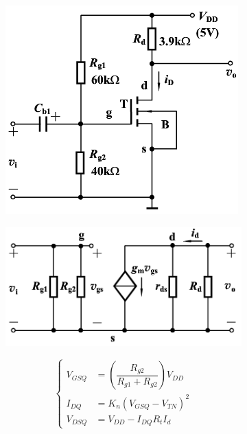 \begin{figure}[H]
  \centering
  \begin{subfigure}{.3\textwidth}
    \centering
    \includegraphics[width=\linewidth]{figures/MOSFET-Common-S}
  \end{subfigure}
  \begin{subfigure}{.6\textwidth}
    \centering
    \includegraphics[width=\linewidth]{figures/MOSFET-Common-Ss}
  \end{subfigure}
\end{figure}

\begin{equation*}
  \left\{
  \begin{aligned}
    V_{GSQ} &= \left( \dfrac{R_{g2}}{R_{g1} + R_{g2}}  \right) V_{DD} \\
    I_{DQ} &= K_n \left( V_{GSQ} - V_{TN} \right)^2 \\
    V_{DSQ} &= V_{DD} - I_{DQ} R_tI_d
  \end{aligned}
  \right.
\end{equation*}

